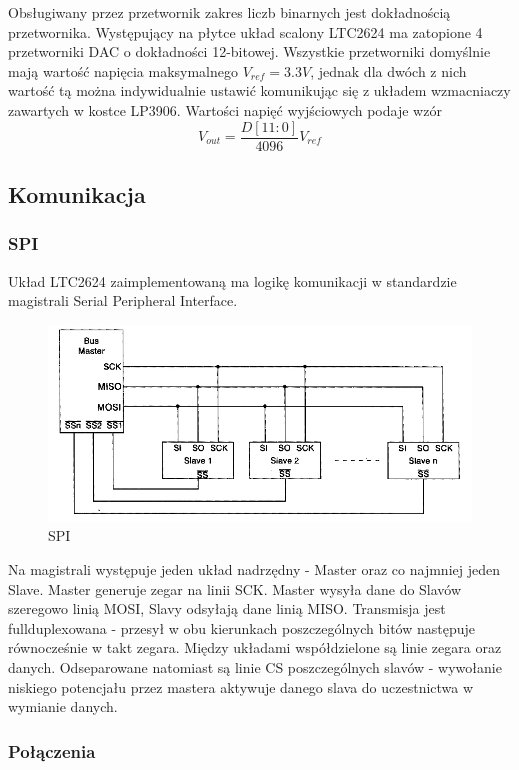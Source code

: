 \documentclass[a4paper,12pt]{article}
\begin{document}
Obsługiwany przez przetwornik zakres liczb binarnych jest dokładnością przetwornika. Występujący na płytce układ scalony LTC2624 ma zatopione 4 przetworniki DAC o dokładności 12-bitowej. Wszystkie przetworniki domyślnie mają wartość napięcia maksymalnego $V_{ref} = 3.3V$, jednak dla dwóch z nich wartość tą można indywidualnie ustawić komunikując się z układem wzmacniaczy zawartych w kostce LP3906. Wartości napięć wyjściowych podaje wzór
$$V_{out} = \frac{D[11:0]}{4096}  V_{ref}$$

\subsection{Komunikacja}

\subsubsection{SPI}
Układ LTC2624 zaimplementowaną ma logikę komunikacji w standardzie magistrali Serial Peripheral Interface.

\begin{figure}[htb]
   \centering
   \includegraphics[width=15cm]{grafika/spi.jpg}
   \caption{SPI}
\end{figure}

Na magistrali występuje jeden układ nadrzędny - Master oraz co najmniej jeden Slave.
Master generuje zegar na linii SCK.
Master wysyła dane do Slavów szeregowo linią MOSI, Slavy odsyłają dane linią MISO. Transmisja jest fullduplexowana - przesył w obu kierunkach poszczególnych bitów następuje równocześnie w takt zegara.
Między układami współdzielone są linie zegara oraz danych. Odseparowane natomiast są linie CS poszczególnych slavów - wywołanie niskiego potencjału przez mastera aktywuje danego slava do uczestnictwa w wymianie danych.


\newpage
\subsubsection{Połączenia}
\end{document}
